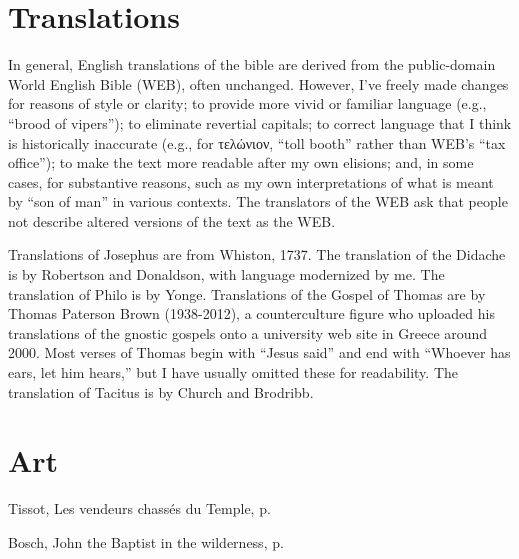 \documentclass[10pt,twoside]{article} %
\newcommand{\artcredit}[3]{#2, #3, p.~\pageref{fig:#1}}
\begin{document}
\section*{Translations}

In general, English translations of the bible are derived from the public-domain World English Bible (WEB), often unchanged.
However, I've freely made changes for reasons of style or clarity; to provide more vivid or familiar language
(e.g., ``brood of vipers''); to eliminate revertial capitals; to correct language that I think is historically
inaccurate (e.g., for τελώνιον, ``toll booth'' rather than WEB's ``tax office''); to make the text more readable after my own elisions; and, in some
cases, for substantive reasons, such as my own interpretations of what is meant by ``son of man'' in various contexts.
The translators of the WEB ask that people not describe altered versions of the text as the WEB.

Translations of Josephus are from Whiston, 1737.
The translation of the Didache is by Robertson and Donaldson, with language modernized by me.
The translation of Philo is by Yonge.
Translations of the Gospel of Thomas are  by Thomas Paterson Brown (1938-2012),
a counterculture figure who uploaded his translations of the gnostic gospels onto a university web site
in Greece around 2000. Most verses of Thomas begin with ``Jesus said''
and end with ``Whoever has ears, let him hears,'' but I have usually omitted these for readability.\label{brown-trans}
The translation of Tacitus is by Church and Brodribb.


\vfill

\vfill\pagebreak\section*{Art}
\artcredit{cleansing-temple}{Tissot}{Les vendeurs chassés du Temple}

\artcredit{john-in-the-wilderness}{Bosch}{John the Baptist in the wilderness}
\end{document}
